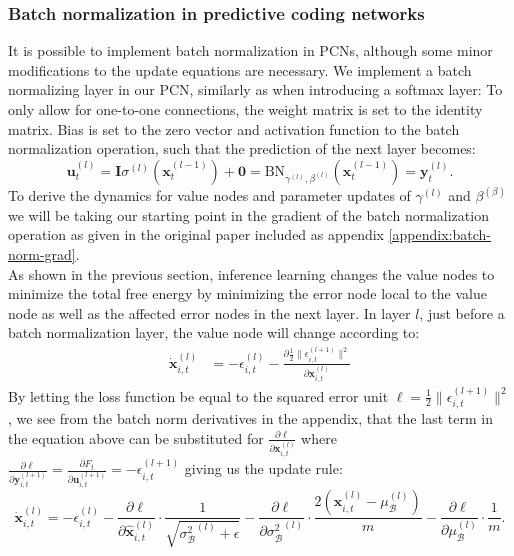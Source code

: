 \documentclass[a4paper,11pt]{article} %
\begin{document}
\newpage 

\subsubsection{Batch normalization in predictive coding networks}
It is possible to implement batch normalization in PCNs, although some minor modifications to the update equations are necessary. We implement a batch normalizing layer in our PCN, similarly as when introducing a softmax layer: To only allow for one-to-one connections, the weight matrix is set to the identity matrix. Bias is set to the zero vector and activation function to the batch normalization operation, such that the prediction of the next layer becomes:
\begin{equation}
  \mathbf{u}_{t}^{(l)} = \mathbf{I} \sigma^{(l)}(\mathbf{x}_{t}^{(l-1)}) + \mathbf{0} = \text{BN}_{\gamma^{(l)},\beta^{(l)}}(\mathbf{x}_{t}^{(l-1)}) = \mathbf{y}_t^{(l)}.
\end{equation}
To derive the dynamics for value nodes and parameter updates of $\gamma^{(l)}$ and $\beta^{(\beta)}$ we will be taking our starting point in the gradient of the batch normalization operation as given in the original paper \cite{ioffe2015batch} included as appendix \ref{appendix:batch-norm-grad}.
\\
As shown in the previous section, inference learning changes the value nodes to minimize the total free energy by minimizing the error node local to the value node as well as the affected error nodes in the next layer. In layer $l$, just before a batch normalization layer, the value node will change according to:
\begin{equation}
  \begin{split}
    \dot{\mathbf{x}}_{i,t}^{(l)} &= -\epsilon_{i,t}^{(l)} - \frac{\partial \frac{1}{2}\lVert\epsilon_{i,t}^{(l+1)}\rVert^{2}}{ \partial \mathbf{x}_{i,t}^{(l)}}
  \end{split}
\end{equation}
By letting the loss function be equal to the squared error unit $\ell=\frac{1}{2}\lVert\epsilon_{i,t}^{(l+1)}\rVert^{2}$, we see from the batch norm derivatives in the appendix, that the last term in the equation above can be substituted for $\frac{\partial \ell}{\partial \mathbf{x}_{i,t}^{(l)}}$ where $\frac{\partial \ell}{\partial \mathbf{y}_{i,t}^{(l+1)}} = \frac{\partial F_t}{\partial \mathbf{u}_{i,t}^{(l+1)}} = - \epsilon_{i,t}^{(l+1)}$ giving us the update rule:
\begin{equation}
  \dot{\mathbf{x}}_{i,t}^{(l)} = -\epsilon_{i, t}^{(l)} - 
    \frac{\partial \ell}{\partial \widehat{\mathbf{x}}_{i,t}^{(l)}} \cdot \frac{1}{\sqrt{ {\sigma_{\mathcal{B}}^{2}}^{(l)} + \epsilon }} - \frac{\partial \ell}{\partial {\sigma_{\mathcal{B}}^{2}}^{(l)}} \cdot \frac{2\left(\mathbf{x}_{i,t}^{(l)}-\mu_{\mathcal{B}}^{(l)} \right)}{m}- \frac{\partial \ell}{\partial \mu_{\mathcal{B}}^{(l)}} \cdot \frac{1}{m}.
\end{equation}
\end{document}
